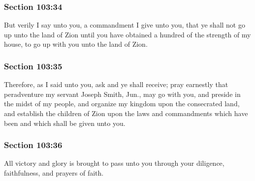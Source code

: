	\subsubsection{Section 103:34} %
		\label{DC103-34}

		But verily I say unto you, a commandment I give unto you, that ye shall not go up unto the land of Zion until you have obtained a hundred of the strength of my house, to go up with you unto the land of Zion.


	\subsubsection{Section 103:35} %
		\label{DC103-35}

		Therefore, as I said unto you, ask and ye shall receive; pray earnestly that peradventure my servant Joseph Smith, Jun., may go with you, and preside in the midst of my people, and organize my kingdom upon the consecrated land, and establish the children of Zion upon the laws and commandments which have been and which shall be given unto you.


	\subsubsection{Section 103:36} %
		\label{DC103-36}

		All victory and glory is brought to pass unto you through your diligence, faithfulness, and prayers of faith.


